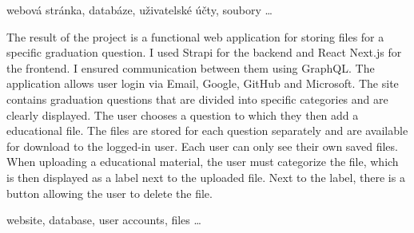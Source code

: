 \documentclass[12pt, a4paper,
oneside,      %
openright
]{report}
\begin{document}
	\vspace{18pt}
	
	
	\noindent webová stránka, databáze, uživatelské účty, soubory \dots 
	
	\vspace{20pt}
	
	
	The result of the project is a functional web application for storing files for a specific graduation question. I used Strapi for the backend and React Next.js for the frontend. I ensured communication between them using GraphQL. The application allows user login via Email, Google, GitHub and Microsoft. The site contains graduation questions that are divided into specific categories and are clearly displayed. The user chooses a question to which they then add a educational file. The files are stored for each question separately and are available for download to the logged-in user. Each user can only see their own saved files. When uploading a educational material, the user must categorize the file, which is then displayed as a label next to the uploaded file. Next to the label, there is a button allowing the user to delete the file.
	\\
	
	\vspace{18pt}
	
	
	\noindent website, database, user accounts, files \dots
	
	\vspace{18pt}
	
	\clearpage %

	
	\tableofcontents %

	\setcounter{page}{1} %

\end{document}

